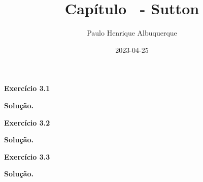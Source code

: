 \documentclass{article}
\title{Capítulo \cha\   - Sutton}
\author{Paulo Henrique Albuquerque}
\date{2023-04-25}
\newcommand\cha{3}
\begin{document}
\maketitle

\textbf{Exercício \cha.1} 
\vspace{5mm}

\textbf{Solução.} 


\textbf{Exercício \cha.2} 
\vspace{5mm}

\textbf{Solução.} 

\textbf{Exercício \cha.3} 
\vspace{5mm}

\textbf{Solução.} 
\end{document}
